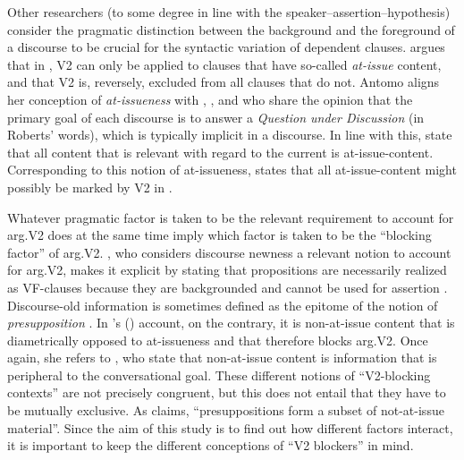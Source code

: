 \documentclass[output=paper,colorlinks,citecolor=brown]{langscibook}
\begin{document}
Other researchers (to some degree in line with the speaker--assertion--\linebreak[4]hypothesis)  consider the pragmatic distinction between the background and the foreground of a discourse to be crucial for the syntactic variation of dependent clauses. \citet{Antomo2016} argues that in , V2 can only be applied to clauses that have so-called \textit{at-issue} content, and that V2 is, reversely, excluded from all clauses that do not. Antomo aligns her conception of \textit{at-issueness} with \citet{KleinStutterheim1992}, \citet{roberts1996}, and \citet{Simons2010} who share the opinion that the primary goal of each discourse is to answer a \textit{Question under Discussion} (in Roberts' words), which is typically implicit in a discourse. In line with this, \citet{Simons2010} state that all content that is relevant with regard to the current  is at-issue-content. Corresponding to this notion of at-issueness, \citet{Antomo2016} states that all at-issue-content might possibly be marked by V2 in .

Whatever pragmatic factor is taken to be the relevant requirement to account for arg.V2 does at the same time imply which factor is taken to be the ``blocking factor'' of arg.V2. \citet{Meinunger2006}, who considers discourse newness a relevant notion to account for arg.V2, makes it explicit by stating that  propositions are necessarily realized as VF-clauses because they are backgrounded and cannot be used for assertion \citep[15]{Meinunger2006}. Discourse-old information is sometimes defined as the epitome of the notion of \textit{presupposition} \citep{lambrecht1996}. In \citeauthor{Antomo2016}'s (\citeyear{Antomo2016}) account, on the contrary, it is non-at-issue content that is diametrically opposed to at-issueness and that therefore blocks arg.V2. Once again, she refers to \citet{Simons2010}, who state that non-at-issue content is information that is peripheral to the conversational goal. These different notions of “V2-blocking contexts” are not precisely congruent, but this does not entail that they have to be mutually exclusive. As \citet[33]{Antomo2016} claims, “presuppositions form a subset of not-at-issue material”. Since the aim of this study is to find out how different factors interact, it is important to keep the different conceptions of “V2 blockers” in mind.
\end{document}
